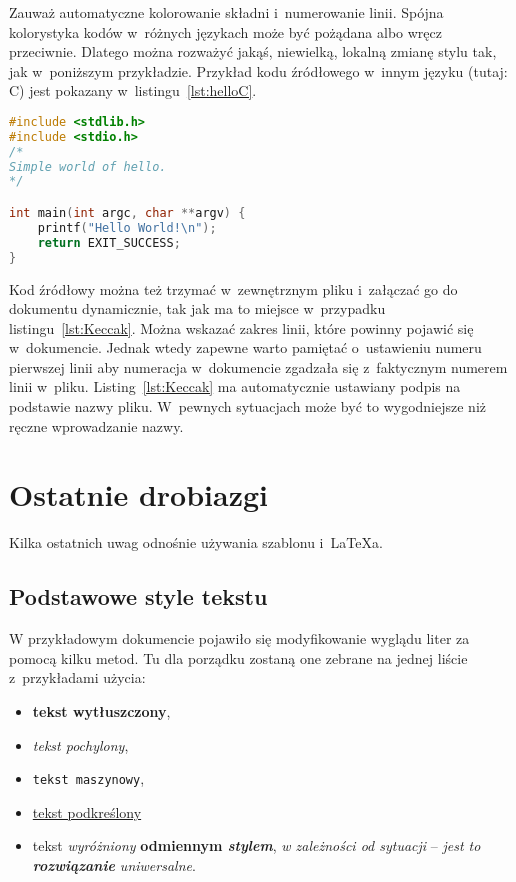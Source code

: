Zauważ automatyczne kolorowanie składni i~numerowanie linii. Spójna kolorystyka kodów w~różnych językach może być pożądana albo wręcz przeciwnie. Dlatego można rozważyć jakąś, niewielką, lokalną zmianę stylu tak, jak w~poniższym przykładzie. Przykład kodu źródłowego w~innym języku (tutaj: C) jest pokazany w~listingu~\ref{lst:helloC}.

\begin{lstlisting}[language=C,
    backgroundcolor=\color{EEGold!5!white},
    caption={Prosty program w~języku C},
    label={lst:helloC}]
#include <stdlib.h>
#include <stdio.h>
/* 
Simple world of hello.
*/

int main(int argc, char **argv) {
	printf("Hello World!\n");
	return EXIT_SUCCESS;
}
\end{lstlisting}

Kod źródłowy można też trzymać w~zewnętrznym pliku i~załączać go do dokumentu dynamicznie, tak jak ma to miejsce w~przypadku listingu~\ref{lst:Keccak}. Można wskazać zakres linii, które powinny pojawić się w~dokumencie. Jednak wtedy zapewne warto pamiętać o~ustawieniu numeru pierwszej linii aby numeracja w~dokumencie zgadzała się z~faktycznym numerem linii w~pliku. Listing~\ref{lst:Keccak} ma automatycznie ustawiany podpis na podstawie nazwy pliku. W~pewnych sytuacjach może być to wygodniejsze niż ręczne wprowadzanie nazwy.



\section{Ostatnie drobiazgi}
Kilka ostatnich uwag odnośnie używania szablonu i~\LaTeX{a}.

\subsection{Podstawowe style tekstu}
W przykładowym dokumencie pojawiło się modyfikowanie wyglądu liter za pomocą kilku metod. Tu dla porządku zostaną one zebrane na jednej liście z~przykładami użycia:
\begin{itemize}
    \item \textbf{tekst wytłuszczony},
    \item \textit{tekst pochylony},
    \item \texttt{tekst maszynowy},
    \item \underline{tekst podkreślony}
    \item tekst \emph{wyróżniony} \textbf{odmiennym \emph{stylem}}, \textit{w zależności \emph{od sytuacji}} -- \emph{jest to \textbf{rozwiązanie} \textit{uniwersalne}}.
\end{itemize}

